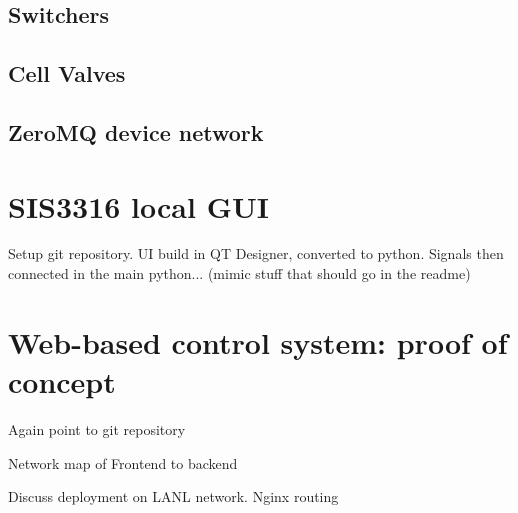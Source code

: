 
\subsection{Switchers}



\subsection{Cell Valves}



\subsection{ZeroMQ device network}



\section{SIS3316 local GUI}


Setup git repository. UI build in QT Designer, converted to python. Signals then connected in the main python... (mimic stuff that should go in the readme)


\section{Web-based control system: proof of concept}


Again point to git repository

Network map of Frontend to backend

Discuss deployment on LANL network. Nginx routing